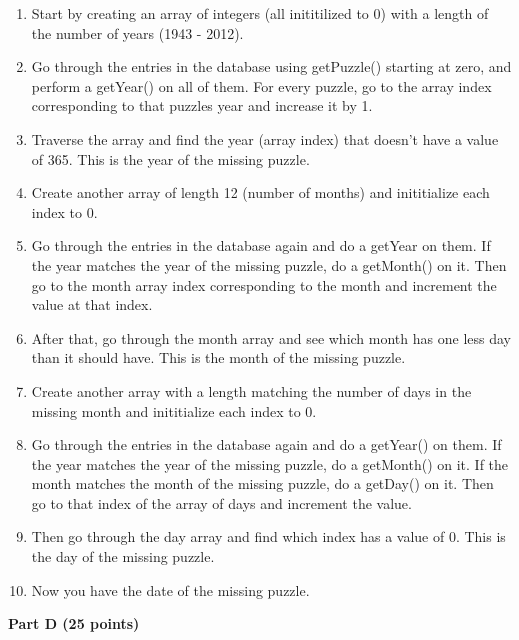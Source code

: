 \documentclass{article}
\begin{document}
\begin{enumerate}

\item Start by creating an array of integers (all inititilized to 0) with a length of the number of years (1943 - 2012).

\item Go through the entries in the database using getPuzzle() starting at zero, and perform
a getYear() on all of them.  For every puzzle, go to the array index corresponding to that puzzles 
year and increase it by 1. 

\item Traverse the array and find the year (array index) that doesn't have a value of 365.  This is the year of the 
missing puzzle.

\item Create another array of length 12 (number of months) and inititialize each index to 0.

\item Go through the entries in the database again and do a getYear on them.  If the year matches the 
year of the missing puzzle, do a getMonth() on it.  Then go to the month array index corresponding to the month
and increment the value at that index.

\item After that, go through the month array and see which month has one less day than it should have.  This is the month of the missing puzzle.

\item Create another array with a length matching the number of days in the missing month
and inititialize each index to 0.

\item Go through the entries in the database again and do a getYear() on them.  If the year matches the 
year of the missing puzzle, do a getMonth() on it.  If the month matches the month of the missing puzzle, do a getDay()
on it.  Then go to that index of the array of days and increment the value.  

\item Then go through the day array and find which index has a value of 0.  This is the day of the missing puzzle.

\item Now you have the date of the missing puzzle.

\end{enumerate}

\begin{center}
{\bf Part D (25 points)}
\end{center}
\end{document}
